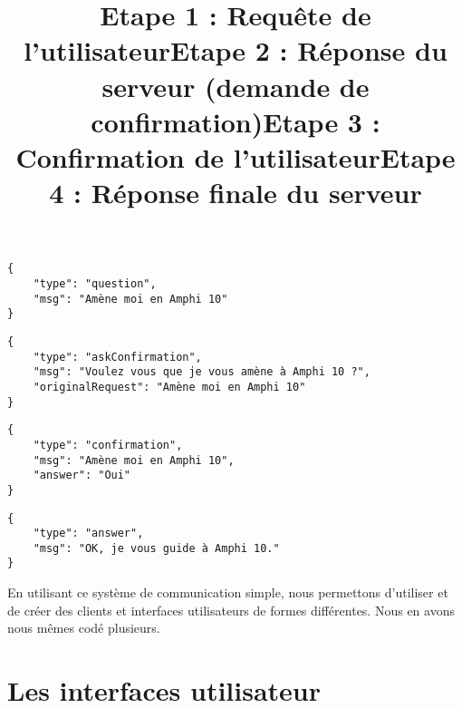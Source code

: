 \documentclass[a4paper,10pt]{report}
\begin{document}
          \begin{listing}[h]
            \begin{verbatim}
{
    "type": "question",
    "msg": "Amène moi en Amphi 10"
}
            \end{verbatim}
            \title{Etape 1 : Requête de l'utilisateur}
          \end{listing}
          \begin{listing}[h]
            \begin{verbatim}
{
    "type": "askConfirmation",
    "msg": "Voulez vous que je vous amène à Amphi 10 ?",
    "originalRequest": "Amène moi en Amphi 10"
}
            \end{verbatim}
            \title{Etape 2 : Réponse du serveur (demande de confirmation)}
          \end{listing}
          \begin{listing}[h]
            \begin{verbatim}
{
    "type": "confirmation",
    "msg": "Amène moi en Amphi 10",
    "answer": "Oui"
}
            \end{verbatim}
            \title{Etape 3 : Confirmation de l'utilisateur}

            \begin{verbatim}
{
    "type": "answer",
    "msg": "OK, je vous guide à Amphi 10."
}
            \end{verbatim}
            \title{Etape 4 : Réponse finale du serveur}
          \end{listing}

          {En utilisant ce système de communication simple, nous permettons d'utiliser et de créer des clients et interfaces utilisateurs de formes différentes. Nous en avons nous mêmes codé plusieurs.}
      \newpage
      \section{Les interfaces utilisateur}
\end{document}
